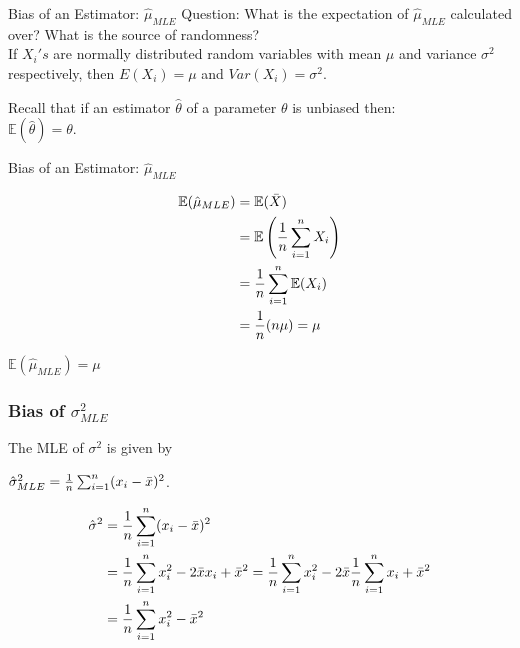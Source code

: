 \documentclass{beamer}
\begin{document}
    \begin{frame}{Bias of an Estimator: $\hat{\mu}_{MLE}$}
        \pause 
        Question: What is the expectation of $\hat{\mu}_{MLE}$ calculated over? What is the source of randomness? \\
        If $X_i's$ are normally distributed random variables with mean $\mu$ and variance $\sigma^2 $ respectively, then $E(X_i) = \mu$ and $Var(X_i)=\sigma^2.$

        Recall that if an estimator $\hat{\theta}$ of a parameter $\theta$ is unbiased then:\\
        $\mathbb{E}(\hat{\theta})=\theta.$
    
        
    \end{frame}
    
    \begin{frame}{Bias of an Estimator: $\hat{\mu}_{MLE}$}
        
        \begin{align*}
            \mathbb{E}(\hat{\mu}_{MLE}) &= \mathbb{E}(\Bar{X}) \\
            &=\mathbb{E}\left(\frac{1}{n}\sum_{i=1}^nX_i\right) \\
            &=\frac{1}{n}\sum_{i=1}^n\mathbb{E}(X_i) \\
            &=\frac{1}{n}(n\mu) = \mu
        \end{align*}
        
        
        \begin{tcolorbox}[colback=metropolisblue!5,colframe=metropolisblue,title= Estimator $\hat{\mu}_{MLE}$ is unbiased]
            $\mathbb{E}(\hat{\mu}_{MLE}) = \mu$
        \end{tcolorbox}

        
    \end{frame}

    \begin{frame}
        \frametitle{Bias of $\sigma^2_{MLE}$}
        
        The MLE of $\sigma^2$ is given by
        
        $\hat{\sigma}^2_{MLE} = \frac{1}{n} \sum_{i=1}^n (x_i-\Bar{x})^2$.
        
        \begin{align*}
            \hat{\sigma}^2 &= \frac{1}{n} \sum_{i=1}^n (x_i-\Bar{x})^2 \\
            &= \frac{1}{n} \sum_{i=1}^n x_i^2 - 2\Bar{x} x_i + \Bar{x}^2 = \frac{1}{n} \sum_{i=1}^n x_i^2  -2\Bar{x}\frac{1}{n}\sum_{i=1}^nx_i+ \Bar{x}^2 \\
            &= \frac{1}{n}\sum_{i=1}^nx_i^2 - \Bar{x}^2
            \end{align*}

        \end{frame}
\end{document}
